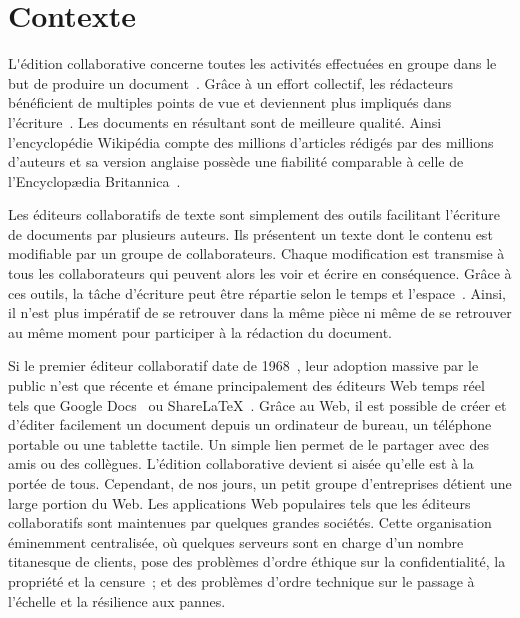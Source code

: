 
\section{Contexte}

\lettrine{L}'édition collaborative concerne toutes les activités effectuées en
groupe dans le but de produire un document~\cite{ellis1989concurrency,
  johansen1988groupware}. Grâce à un effort collectif, les rédacteurs
bénéficient de multiples points de vue et deviennent plus impliqués dans
l'écriture~\cite{noel2004empirical}. Les documents en résultant sont de
meilleure qualité. Ainsi l'encyclopédie Wikipédia compte des millions d'articles
rédigés par des millions d'auteurs et sa version anglaise possède une fiabilité
comparable à celle de l'Encyclopædia Britannica~\cite{giles2005internet}.

Les éditeurs collaboratifs de texte sont simplement des outils facilitant
l'écriture de documents par plusieurs auteurs. Ils présentent un texte dont le
contenu est modifiable par un groupe de collaborateurs. Chaque modification est
transmise à tous les collaborateurs qui peuvent alors les voir et écrire en
conséquence. Grâce à ces outils, la tâche d'écriture peut être répartie selon le
temps et l'espace~\cite{desanctis1987foundation, grudin1994computersupported,
  johansen1988groupware}. Ainsi, il n'est plus impératif de se retrouver dans la
même pièce ni même de se retrouver au même moment pour participer à la rédaction
du document.

Si le premier éditeur collaboratif date de 1968~\cite{engelbart1968research},
leur adoption massive par le public n'est que récente
et émane principalement des éditeurs Web temps réel~\cite{mogan2010impact,
  perkel2014scientific} tels que Google Docs~\cite{googledocs} ou
ShareLaTeX~\cite{sharelatex}. Grâce au Web, il est possible de créer et d'éditer
facilement un document depuis un ordinateur de bureau, un téléphone portable ou
une tablette tactile. Un simple lien permet de le partager avec des amis ou des
collègues. L'édition collaborative devient si aisée qu'elle est à la portée de
tous.  Cependant, de nos jours, un petit groupe d'entreprises détient une
large portion du Web. Les applications Web populaires tels que les éditeurs
collaboratifs sont maintenues par quelques grandes sociétés.  %
Cette organisation éminemment centralisée, où quelques serveurs sont en charge
d'un nombre titanesque de clients, pose des problèmes d'ordre éthique sur la
confidentialité, la propriété et la censure~\cite{cherrueau2016composer,
  gellman2013us, pearson2011toward}; et des problèmes d'ordre technique sur le
passage à l'échelle et la résilience aux pannes.


